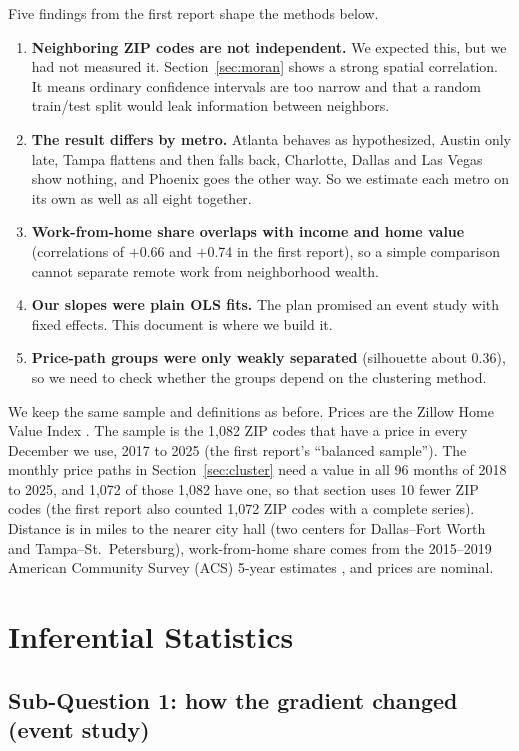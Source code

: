 \documentclass[11pt]{article}
\begin{document}
Five findings from the first report shape the methods below.
\begin{enumerate}
\item \textbf{Neighboring ZIP codes are not independent.} We expected this, but we had not measured it. Section~\ref{sec:moran}
shows a strong spatial correlation. It means ordinary confidence intervals are too narrow and that a random train/test split
would leak information between neighbors.
\item \textbf{The result differs by metro.} Atlanta behaves as hypothesized, Austin only late, Tampa flattens and then falls back,
Charlotte, Dallas and Las Vegas show nothing, and Phoenix goes the other way. So we estimate each metro on its own as well as
all eight together.
\item \textbf{Work-from-home share overlaps with income and home value} (correlations of $+$0.66 and $+$0.74 in the first
report), so a simple comparison cannot separate remote work from neighborhood wealth.
\item \textbf{Our slopes were plain OLS fits.} The plan promised an event study with fixed effects. This document is where we
build it.
\item \textbf{Price-path groups were only weakly separated} (silhouette about 0.36), so we need to check whether the groups
depend on the clustering method.
\end{enumerate}

We keep the same sample and definitions as before. Prices are the Zillow Home Value Index \cite{zhvi}. The sample is the 1,082 ZIP
codes that have a price in every December we use, 2017 to 2025 (the first report's ``balanced sample''). The monthly price paths in
Section~\ref{sec:cluster} need a value in all 96 months of 2018 to 2025, and 1,072 of those 1,082 have one, so that section uses 10
fewer ZIP codes (the first report also counted 1,072 ZIP codes with a complete series). Distance is in miles to the nearer city hall
(two centers for Dallas--Fort Worth and Tampa--St.\ Petersburg), work-from-home share comes from the 2015--2019 American Community
Survey (ACS) 5-year estimates \cite{acs}, and prices are nominal.

\section{Inferential Statistics}

\subsection{Sub-Question 1: how the gradient changed (event study)}
\label{sec:event}
\end{document}
